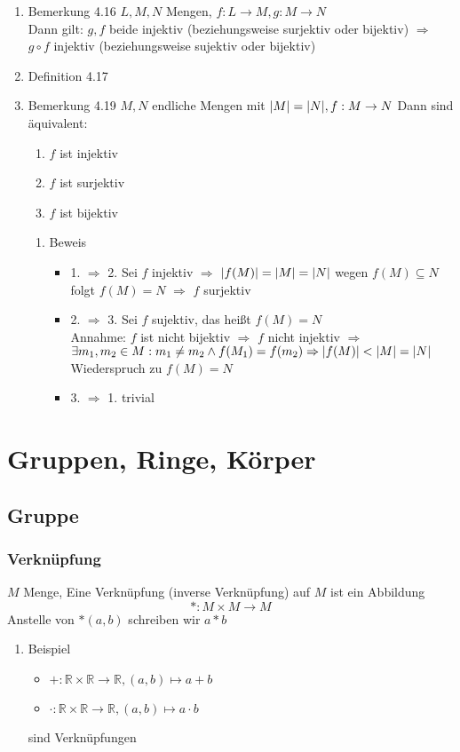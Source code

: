 \documentclass[11pt]{article}
\DeclarePairedDelimiter\abs{\lvert}{\rvert}%
\begin{document}
\begin{enumerate}
\begin{enumerate}
\end{enumerate}
\item Bemerkung 4.16
\label{sec-2-6-7-8}
$L,M,N$ Mengen, $f:L\to M, g:M\to N$ \\
     Dann gilt: $g,f$ beide injektiv (beziehungsweise surjektiv oder bijektiv) $\Rightarrow$ $g\circ f$ injektiv (beziehungsweise sujektiv oder bijektiv)
\item Definition 4.17
\label{sec-2-6-7-9}
\item Bemerkung 4.19
\label{sec-2-6-7-10}
$M,N$ endliche Mengen mit $\abs{M} = \abs{N},f:M\to N$ Dann sind äquivalent:
\begin{enumerate}
\item $f$ ist injektiv
\item $f$ ist surjektiv
\item $f$ ist bijektiv
\end{enumerate}
\begin{enumerate}
\item Beweis
\label{sec-2-6-7-10-1}
\begin{itemize}
\item 1. $\Rightarrow$ 2. Sei $f$ injektiv $\Rightarrow$ $\abs{f(M)} = \abs{M} = \abs{N}$ wegen $f(M) \subseteq N$ folgt $f(M) = N$ $\Rightarrow$ $f$ surjektiv
\item 2. $\Rightarrow$ 3. Sei $f$ sujektiv, das heißt $f(M) = N$ \\
        Annahme: $f$ ist nicht bijektiv $\Rightarrow$ $f$ nicht injektiv $\Rightarrow$ $\exists m_1,m_2\in M: m_1\neq m_2 \wedge f(M_1) = f(m_2) \Rightarrow \abs{f(M)} < \abs{M} = \abs{N}$ Wiederspruch zu $f(M) = N$
\item 3. $\Rightarrow$ 1. trivial
\end{itemize}
\end{enumerate}
\end{enumerate}
\section{Gruppen, Ringe, Körper}
\label{sec-3}
\subsection{Gruppe}
\label{sec-3-1}
\subsubsection{Verknüpfung}
\label{sec-3-1-1}
$M$ Menge, Eine Verknüpfung (inverse Verknüpfung) auf $M$ ist ein Abbildung \[*:M\times M \to M\]
Anstelle von $*(a,b)$ schreiben wir $a * b$
\begin{enumerate}
\item Beispiel
\label{sec-3-1-1-1}
\begin{itemize}
\item $+: \mathbb{R} \times \mathbb{R} \to \mathbb{R},(a,b) \mapsto a + b$
\item $\cdot: \mathbb{R} \times \mathbb{R} \to \mathbb{R},(a,b) \mapsto a\cdot b$
\end{itemize}
sind Verknüpfungen
\end{enumerate}
\end{document}
